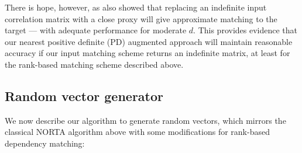 \documentclass[
]{jss}
\begin{document}
There is hope, however, as \citet{GH02} also showed that replacing an indefinite input correlation matrix with a close proxy will give approximate matching to the target --- with adequate performance for moderate \(d\). This provides evidence that our nearest positive definite (PD) augmented approach will maintain reasonable accuracy if our input matching scheme returns an indefinite matrix, at least for the rank-based matching scheme described above.

\hypertarget{rand-vec-gen}{%
\subsection{Random vector generator}\label{rand-vec-gen}}

We now describe our algorithm to generate random vectors, which mirrors the classical NORTA algorithm above with some modifications for rank-based dependency matching:

\end{document}
